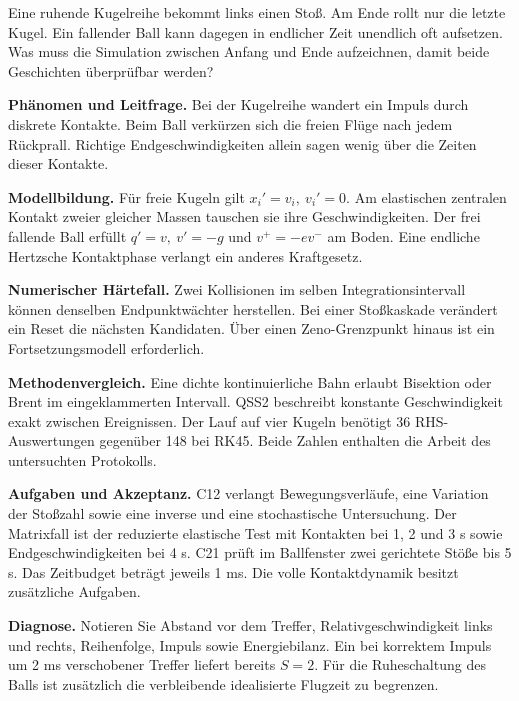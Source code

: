 Eine ruhende Kugelreihe bekommt links einen Stoß. Am Ende rollt nur die letzte Kugel. Ein fallender Ball kann dagegen in endlicher Zeit unendlich oft aufsetzen. Was muss die Simulation zwischen Anfang und Ende aufzeichnen, damit beide Geschichten überprüfbar werden?
\par\textsf{\bfseries\color{sea}Phänomen und Leitfrage.} Bei der Kugelreihe wandert ein Impuls durch diskrete Kontakte. Beim Ball verkürzen sich die freien Flüge nach jedem Rückprall. Richtige Endgeschwindigkeiten allein sagen wenig über die Zeiten dieser Kontakte.
\par\textsf{\bfseries\color{sea}Modellbildung.} Für freie Kugeln gilt \(x_i'=v_i,\ v_i'=0\). Am elastischen zentralen Kontakt zweier gleicher Massen tauschen sie ihre Geschwindigkeiten. Der frei fallende Ball erfüllt \(q'=v,\ v'=-g\) und \(v^+=-e v^-\) am Boden. Eine endliche Hertzsche Kontaktphase verlangt ein anderes Kraftgesetz.
\par\textsf{\bfseries\color{sea}Numerischer Härtefall.} Zwei Kollisionen im selben Integrationsintervall können denselben Endpunktwächter herstellen. Bei einer Stoßkaskade verändert ein Reset die nächsten Kandidaten. Über einen Zeno-Grenzpunkt hinaus ist ein Fortsetzungsmodell erforderlich.
\par\textsf{\bfseries\color{sea}Methodenvergleich.} Eine dichte kontinuierliche Bahn erlaubt Bisektion oder Brent im eingeklammerten Intervall. QSS2 beschreibt konstante Geschwindigkeit exakt zwischen Ereignissen. Der Lauf auf vier Kugeln benötigt 36 RHS-Auswertungen gegenüber 148 bei RK45. Beide Zahlen enthalten die Arbeit des untersuchten Protokolls.
\par\textsf{\bfseries\color{sea}Aufgaben und Akzeptanz.} C12 verlangt Bewegungsverläufe, eine Variation der Stoßzahl sowie eine inverse und eine stochastische Untersuchung. Der Matrixfall ist der reduzierte elastische Test mit Kontakten bei 1, 2 und 3 s sowie Endgeschwindigkeiten bei 4 s. C21 prüft im Ballfenster zwei gerichtete Stöße bis 5 s. Das Zeitbudget beträgt jeweils 1 ms. Die volle Kontaktdynamik besitzt zusätzliche Aufgaben.
\par\textsf{\bfseries\color{sea}Diagnose.} Notieren Sie Abstand vor dem Treffer, Relativgeschwindigkeit links und rechts, Reihenfolge, Impuls sowie Energiebilanz. Ein bei korrektem Impuls um 2 ms verschobener Treffer liefert bereits \(S=2\). Für die Ruheschaltung des Balls ist zusätzlich die verbleibende idealisierte Flugzeit zu begrenzen.


